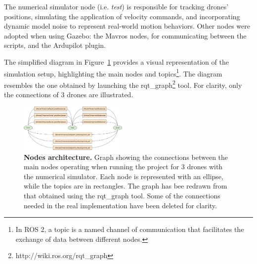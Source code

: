 The numerical simulator node (i.e. \textit{test}) is responsible for tracking drones' positions, simulating the application of velocity commands, and incorporating dynamic model noise to represent real-world motion behaviors.
Other nodes were adopted when using Gazebo: the Mavros nodes, for communicating between the scripts, and the Ardupilot plugin.

The simplified diagram in Figure~\ref{fig:nodes_architecture} provides a visual representation of the simulation setup, highlighting the main nodes and topics\footnote{In ROS 2, a topic is a named channel of communication that facilitates the exchange of data between different nodes.}. 
The diagram resembles the one obtained by launching the rqt\_graph\footnote{http://wiki.ros.org/rqt\_graph} tool. For clarity, only the connections of 3 drones are illustrated.


\begin{figure}[!ht]
  \begin{center}
    \includegraphics[width=0.47\textwidth]{figures/nodes_architecture_color.pdf}
  \end{center}
  \caption[Nodes architecture]{
    \textbf{Nodes architecture.} 
    Graph showing the connections between the main nodes operating when running the project for 3 drones with the numerical simulator. Each node is represented with an ellipse, while the topics are in rectangles. The graph has bee redrawn from that obtained using the rqt\_graph tool. Some of the connections needed in the real implementation have been deleted for clarity.
  }
  \label{fig:nodes_architecture}
\end{figure}

